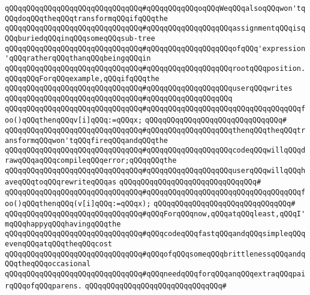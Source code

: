 \verb|qQQqqQQqqQQqqQQqqQQqqQQqqQQqqQQq#qQQqqQQqqQQqoqQQqWeqQQqalsoqQQqwon'tqQQqdoqQQqtheqQQqtransformqQQqifqQQqthe|\newline
\verb|qQQqqQQqqQQqqQQqqQQqqQQqqQQqqQQq#qQQqqQQqqQQqqQQqqQQqassignmentqQQqisqQQqburiedqQQqinqQQqsomeqQQqsub-tree|\newline
\verb|qQQqqQQqqQQqqQQqqQQqqQQqqQQqqQQq#qQQqqQQqqQQqqQQqqQQqofqQQq'expression'qQQqratherqQQqthanqQQqbeingqQQqin|\newline
\verb|qQQqqQQqqQQqqQQqqQQqqQQqqQQqqQQq#qQQqqQQqqQQqqQQqqQQqrootqQQqposition.qQQqqQQqForqQQqexample,qQQqifqQQqthe|\newline
\verb|qQQqqQQqqQQqqQQqqQQqqQQqqQQqqQQq#qQQqqQQqqQQqqQQqqQQquserqQQqwrites|\newline
\verb|qQQqqQQqqQQqqQQqqQQqqQQqqQQqqQQq#qQQqqQQqqQQqqQQqqQQq|\newline
\verb|qQQqqQQqqQQqqQQqqQQqqQQqqQQqqQQq#qQQqqQQqqQQqqQQqqQQqqQQqqQQqqQQqqQQqfoo()qQQqthenqQQqv[i]qQQq:=qQQqx;|\newline
\verb|qQQqqQQqqQQqqQQqqQQqqQQqqQQqqQQq#|\newline
\verb|qQQqqQQqqQQqqQQqqQQqqQQqqQQqqQQq#qQQqqQQqqQQqqQQqqQQqthenqQQqtheqQQqtransformqQQqwon'tqQQqfireqQQqandqQQqthe|\newline
\verb|qQQqqQQqqQQqqQQqqQQqqQQqqQQqqQQq#qQQqqQQqqQQqqQQqqQQqcodeqQQqwillqQQqdrawqQQqaqQQqcompileqQQqerror;qQQqqQQqthe|\newline
\verb|qQQqqQQqqQQqqQQqqQQqqQQqqQQqqQQq#qQQqqQQqqQQqqQQqqQQquserqQQqwillqQQqhaveqQQqtoqQQqrewriteqQQqas|\newline
\verb|qQQqqQQqqQQqqQQqqQQqqQQqqQQqqQQq#|\newline
\verb|qQQqqQQqqQQqqQQqqQQqqQQqqQQqqQQq#qQQqqQQqqQQqqQQqqQQqqQQqqQQqqQQqqQQqfoo()qQQqthenqQQq(v[i]qQQq:=qQQqx);|\newline
\verb|qQQqqQQqqQQqqQQqqQQqqQQqqQQqqQQq#|\newline
\verb|qQQqqQQqqQQqqQQqqQQqqQQqqQQqqQQq#qQQqForqQQqnow,qQQqatqQQqleast,qQQqI'mqQQqhappyqQQqhavingqQQqthe|\newline
\verb|qQQqqQQqqQQqqQQqqQQqqQQqqQQqqQQq#qQQqcodeqQQqfastqQQqandqQQqsimpleqQQqevenqQQqatqQQqtheqQQqcost|\newline
\verb|qQQqqQQqqQQqqQQqqQQqqQQqqQQqqQQq#qQQqofqQQqsomeqQQqbrittlenessqQQqandqQQqtheqQQqoccasional|\newline
\verb|qQQqqQQqqQQqqQQqqQQqqQQqqQQqqQQq#qQQqneedqQQqforqQQqanqQQqextraqQQqpairqQQqofqQQqparens.|\newline
\verb|qQQqqQQqqQQqqQQqqQQqqQQqqQQqqQQq#|\newline
